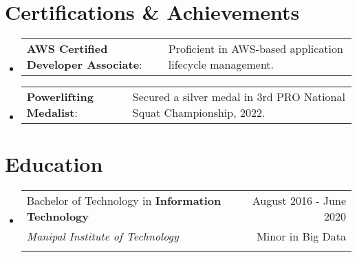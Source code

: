 \documentclass[letterpaper,11pt]{article}
\makeatletter
\newcommand{\sectionStart}{
  \begin{itemize}[label={},leftmargin=0in]
}
\newcommand{\sectionEnd}{
  \end{itemize}
}
\newcommand{\educationItem}[5]{
  \vspace{-1pt}
  \item
  \begin{tabular*}{\textwidth}{l@{\extracolsep{\fill}}r@{}}
    \footnotesize{#1 in \textbf{#2}}  & \footnotesize{#3}\\
    \footnotesize{\textit{#4}} & \footnotesize{#5}\\\vspace{-5pt}
  \end{tabular*}
  \vspace{-5pt}
}
\newcommand{\certItem}[2]{
  \vspace{-1pt}
  \item
  \begin{tabular*}{1.0\textwidth}{l@{}l@{}}
    \footnotesize{\textbf{#1}: } & \footnotesize{#2}
  \end{tabular*}\vspace{-22pt}
}
\makeatother
\begin{document}
\section{Certifications \& Achievements}
\sectionStart
    \certItem 
     {AWS Certified Developer Associate} {Proficient in AWS-based application lifecycle management.}
    \certItem 
     {Powerlifting Medalist} {Secured a silver medal in 3rd PRO National Squat Championship, 2022.}
\sectionEnd


\section{Education}
\sectionStart
  \educationItem
    {Bachelor of Technology} 
    {Information Technology} 
    {August 2016 - June 2020}
    {Manipal Institute of Technology} 
    {Minor in Big Data}
\sectionEnd
\end{document}

